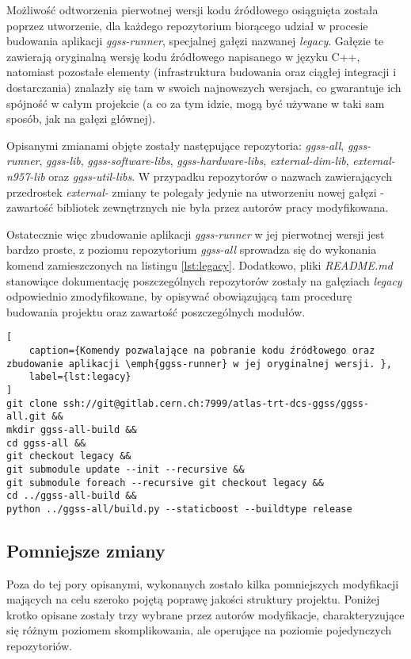 Możliwość odtworzenia pierwotnej wersji kodu źródłowego osiągnięta została poprzez utworzenie, dla każdego repozytorium biorącego udział w procesie budowania aplikacji \emph{ggss-runner}, specjalnej gałęzi nazwanej \emph{legacy}. Gałęzie te zawierają oryginalną wersję kodu źródłowego napisanego w języku C++, natomiast pozostałe elementy (infrastruktura budowania oraz ciągłej integracji i dostarczania) znalazły się tam w swoich najnowszych wersjach, co gwarantuje ich spójność w całym projekcie (a co za tym idzie, mogą być używane w taki sam sposób, jak na gałęzi głównej).

Opisanymi zmianami objęte zostały następujące repozytoria: \emph{ggss-all}, \emph{ggss-runner}, \emph{ggss-lib}, \emph{ggss-software-libs}, \emph{ggss-hardware-libs}, \emph{external-dim-lib}, \emph{external-n957-lib} oraz \emph{ggss-util-libs}. W przypadku repozytorów o nazwach zawierających przedrostek \emph{external-} zmiany te polegały jedynie na utworzeniu nowej gałęzi - zawartość bibliotek zewnętrznych nie była przez autorów pracy modyfikowana.

Ostatecznie więc zbudowanie aplikacji \emph{ggss-runner} w jej pierwotnej wersji jest bardzo proste, z poziomu repozytorium \emph{ggss-all} sprowadza się do wykonania komend zamieszczonych na listingu \ref{lst:legacy}. Dodatkowo, pliki \emph{README.md} stanowiące dokumentację poszczególnych repozytorów zostały na gałęziach \emph{legacy} odpowiednio zmodyfikowane, by opisywać obowiązującą tam procedurę budowania projektu oraz zawartość poszczególnych modułów.

\begin{lstlisting}[
    caption={Komendy pozwalające na pobranie kodu źródłowego oraz zbudowanie aplikacji \emph{ggss-runner} w jej oryginalnej wersji. },
    label={lst:legacy}
]
git clone ssh://git@gitlab.cern.ch:7999/atlas-trt-dcs-ggss/ggss-all.git &&
mkdir ggss-all-build &&
cd ggss-all &&
git checkout legacy &&
git submodule update --init --recursive &&
git submodule foreach --recursive git checkout legacy &&
cd ../ggss-all-build &&
python ../ggss-all/build.py --staticboost --buildtype release
\end{lstlisting}

\subsection{Pomniejsze zmiany}
Poza do tej pory opisanymi, wykonanych zostało kilka pomniejszych modyfikacji mających na celu szeroko pojętą poprawę jakości struktury projektu. Poniżej krotko opisane zostały trzy wybrane przez autorów modyfikacje, charakteryzujące się różnym poziomem skomplikowania, ale operujące na poziomie pojedynczych repozytoriów. 

